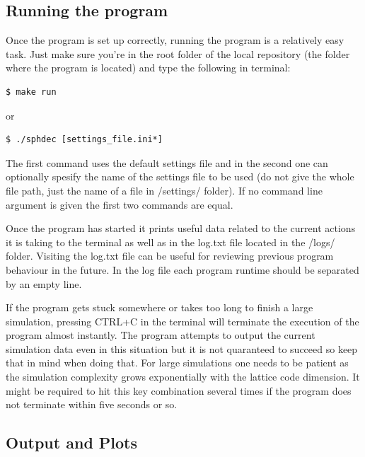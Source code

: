 \documentclass[english,12pt,a4paper,pdftex,sci,utf8]{aaltothesis}
\begin{document}
\subsection{Running the program}

Once the program is set up correctly, running the program is a relatively easy task. Just make sure you're in the root folder of the local repository (the folder where the program is located) and type the following in terminal:
\begin{verbatim}
$ make run
\end{verbatim}
or
\begin{verbatim}
$ ./sphdec [settings_file.ini*]
\end{verbatim}

\noindent The first command uses the default settings file and in the second one can optionally spesify the name of the settings file to be used (do not give the whole file path, just the name of a file in /settings/ folder). If no command line argument is given the first two commands are equal. %
\par Once the program has started it prints useful data related to the current actions it is taking to the terminal as well as in the log.txt file located in the /logs/ folder. Visiting the log.txt file can be useful for reviewing previous program behaviour in the future. In the log file each program runtime should be separated by an empty line.
\par If the program gets stuck somewhere or takes too long to finish a large simulation, pressing CTRL+C in the terminal will terminate the execution of the program almost instantly. The program attempts to output the current simulation data even in this situation but it is not quaranteed to succeed so keep that in mind when doing that. For large simulations one needs to be patient as the simulation complexity grows exponentially with the lattice code dimension. It might be required to hit this key combination several times if the program does not terminate within five seconds or so.

\subsection{Output and Plots}
\end{document}
